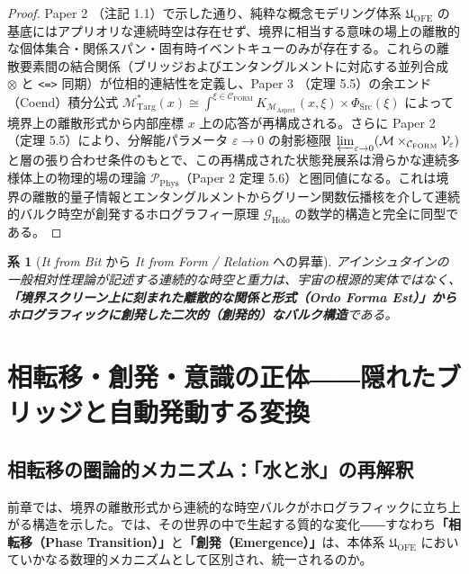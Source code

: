 \documentclass[11pt,a4paper]{ltjsarticle}
\theoremstyle{definition}
\theoremstyle{plain}
\newtheorem{corollary}{系}[section]
\begin{document}
\begin{proof}
Paper 2 \cite{Ota2026_2}（注記 1.1）で示した通り、純粋な概念モデリング体系 $\mathfrak{U}_{\mathrm{OFE}}$ の基底にはアプリオリな連続時空は存在せず、境界に相当する意味の場上の離散的な個体集合・関係スパン・固有時イベントキューのみが存在する。これらの離散要素間の結合関係（ブリッジおよびエンタングルメントに対応する並列合成 $\otimes$ と \texttt{<=>} 同期）が位相的連結性を定義し、Paper 3 \cite{Ota2026_3}（定理 5.5）の余エンド（Coend）積分公式 $\mathcal{M}_{\mathrm{Targ}}^*(x) \cong \int^{\xi \in \mathcal{C}_{\mathrm{FORM}}} K_{\mathcal{M}_{\mathrm{Aspect}}}(x, \xi) \times \Phi_{\mathrm{Src}}(\xi)$ によって境界上の離散形式から内部座標 $x$ 上の応答が再構成される。さらに Paper 2 \cite{Ota2026_2}（定理 5.5）により、分解能パラメータ $\varepsilon \to 0$ の射影極限 $\varprojlim_{\varepsilon \to 0} (\mathcal{M} \times_{\mathcal{C}_{\mathrm{FORM}}} \mathcal{V}_{\varepsilon})$ と層の張り合わせ条件のもとで、この再構成された状態発展系は滑らかな連続多様体上の物理的場の理論 $\mathcal{P}_{\mathrm{Phys}}$（Paper 2 \cite{Ota2026_2} 定理 5.6）と圏同値になる。これは境界の離散的量子情報とエンタングルメントからグリーン関数伝播核を介して連続的バルク時空が創発するホログラフィー原理 $\mathcal{G}_{\mathrm{Holo}}$ の数学的構造と完全に同型である。
\end{proof}

\begin{corollary}[\textit{It from Bit} から \textit{It from Form / Relation} への昇華]
アインシュタインの一般相対性理論が記述する連続的な時空と重力は、宇宙の根源的実体ではなく、\textbf{「境界スクリーン上に刻まれた離散的な関係と形式（\textit{Ordo Forma Est}）」からホログラフィックに創発した二次的（創発的）なバルク構造}である。
\end{corollary}

\section{相転移・創発・意識の正体――隠れたブリッジと自動発動する変換}

\subsection{相転移の圏論的メカニズム：「水と氷」の再解釈}
前章では、境界の離散形式から連続的な時空バルクがホログラフィックに立ち上がる構造を示した。では、その世界の中で生起する質的な変化――すなわち\textbf{「相転移（Phase Transition）」}と\textbf{「創発（Emergence）」}は、本体系 $\mathfrak{U}_{\mathrm{OFE}}$ においていかなる数理的メカニズムとして区別され、統一されるのか。
\end{document}
